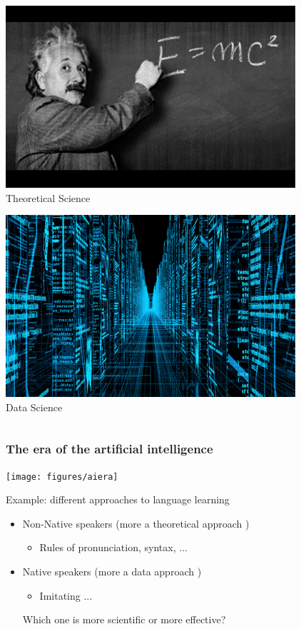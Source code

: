 \documentclass{beamer}
\begin{document}
\begin{CJK*}{UTF8}{gbsn}
\begin{frame}
\begin{columns}
	\begin{column}{0.5\textwidth}
		\centering
		\includegraphics[width=0.8\linewidth]{figures/Theoretical.png} \\
		Theoretical Science
		
		\vspace{4mm}
		
		\includegraphics[width=0.8\linewidth]{figures/Data.png} \\
		Data Science
	\end{column}
\end{columns}
\end{frame}

\begin{frame}
\frametitle{The era of the artificial intelligence}
		\centering
		\texttt{[image: figures/aiera]} 
\end{frame}

\begin{frame}{Example: different approaches to language learning}
\begin{itemize}
	\item Non-Native speakers (more a theoretical approach )
	\begin{itemize}
	\item Rules of pronunciation,  syntax, ...
	\end{itemize}
    \item Native speakers (more a data approach )
	\begin{itemize}
	\item Imitating ...
	\end{itemize}
Which one is more scientific or more effective?
\end{itemize}
\end{frame}




\end{CJK*}
\end{document}
